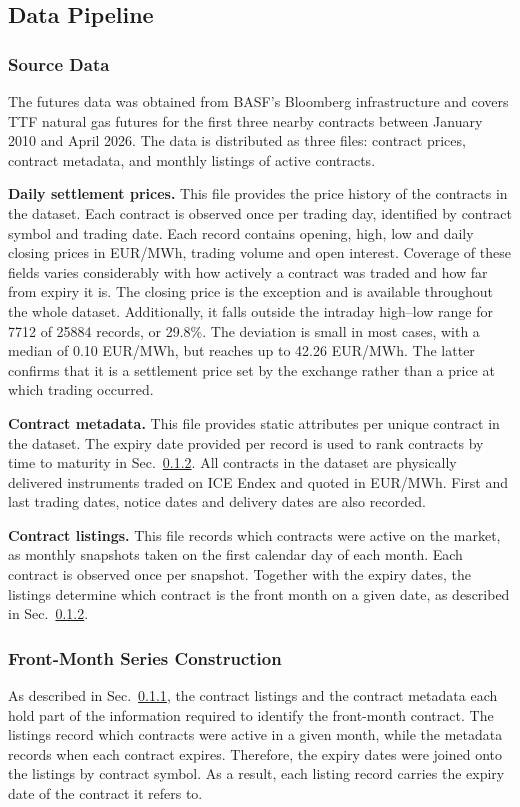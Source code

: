 \subsection{Data Pipeline}\label{sec:data-pipeline}

\subsubsection{Source Data}\label{sec:source-data}
The futures data was obtained from BASF's Bloomberg infrastructure and covers
TTF natural gas futures for the first three nearby contracts between January
2010 and April 2026. The data is distributed as three files: contract prices, contract metadata, and monthly listings of active contracts.

\textbf{Daily settlement prices.} This file provides the price history of the contracts in the dataset.  Each contract is observed once per trading day, identified by contract symbol and trading date. Each record contains opening, high, low and daily closing prices in EUR/MWh, trading volume and open interest. Coverage of these fields varies considerably with how actively a contract was traded and how far from expiry it is. The closing price is the exception and is available throughout the whole dataset. Additionally, it falls outside the intraday high–low range for \num{7712} of \num{25884}  records, or 29.8\%. The deviation is small in most cases, with a median of \num{0.10} EUR/MWh, but reaches up to \num{42.26} EUR/MWh. The latter confirms that it is a settlement price set by the exchange rather than a price at which trading occurred.

\textbf{Contract metadata.} This file provides static attributes per unique contract in the dataset. The expiry date provided per record is used to rank contracts by time to maturity in Sec.~\ref{sec:m1-construction}. All contracts in the dataset are physically delivered instruments traded on ICE Endex and quoted in EUR/MWh. First and last trading dates, notice dates and delivery dates are also recorded.

\textbf{Contract listings.} This file records which contracts were active on the market, as monthly snapshots taken on the first calendar day of each month. Each contract is observed once per snapshot. Together with the expiry dates, the listings determine which contract is the front month on a given date, as described in Sec.~\ref{sec:m1-construction}.

\subsubsection{Front-Month Series Construction}\label{sec:m1-construction}
As described in Sec.~\ref{sec:source-data}, the contract listings and the
contract metadata each hold part of the information required to identify
the front-month contract. The listings record which contracts were active in a
given month, while the metadata records when each contract expires. Therefore, the expiry dates were joined onto the listings by contract symbol. As a result, each listing record carries the expiry date of the contract it refers to. 


